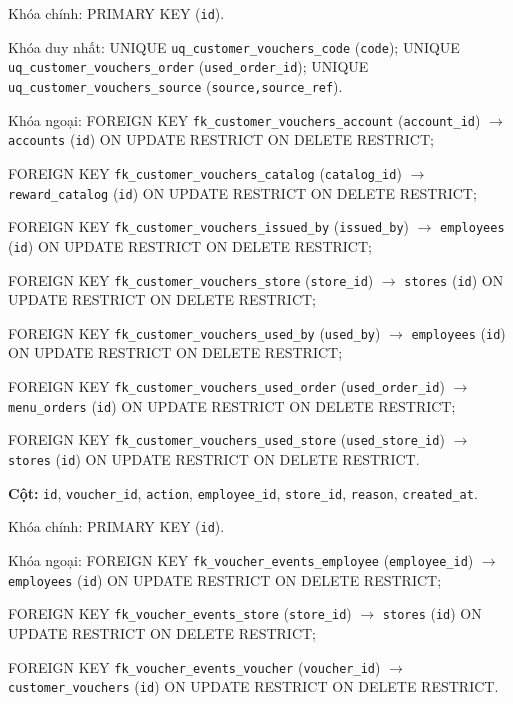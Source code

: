 \begin{description}[leftmargin=3.6cm,labelwidth=3.4cm,style=nextline]
Khóa chính: PRIMARY KEY (\texttt{id}).

Khóa duy nhất: UNIQUE \texttt{uq\_customer\_vouchers\_code} (\texttt{code}); UNIQUE \texttt{uq\_customer\_vouchers\_order} (\texttt{used\_order\_id}); UNIQUE \texttt{uq\_customer\_vouchers\_source} (\texttt{source,source\_ref}).

Khóa ngoại: FOREIGN KEY \texttt{fk\_customer\_vouchers\_account} (\texttt{account\_id}) $\rightarrow$ \texttt{accounts} (\texttt{id}) ON UPDATE RESTRICT ON DELETE RESTRICT;\par FOREIGN KEY \texttt{fk\_customer\_vouchers\_catalog} (\texttt{catalog\_id}) $\rightarrow$ \texttt{reward\_catalog} (\texttt{id}) ON UPDATE RESTRICT ON DELETE RESTRICT;\par FOREIGN KEY \texttt{fk\_customer\_vouchers\_issued\_by} (\texttt{issued\_by}) $\rightarrow$ \texttt{employees} (\texttt{id}) ON UPDATE RESTRICT ON DELETE RESTRICT;\par FOREIGN KEY \texttt{fk\_customer\_vouchers\_store} (\texttt{store\_id}) $\rightarrow$ \texttt{stores} (\texttt{id}) ON UPDATE RESTRICT ON DELETE RESTRICT;\par FOREIGN KEY \texttt{fk\_customer\_vouchers\_used\_by} (\texttt{used\_by}) $\rightarrow$ \texttt{employees} (\texttt{id}) ON UPDATE RESTRICT ON DELETE RESTRICT;\par FOREIGN KEY \texttt{fk\_customer\_vouchers\_used\_order} (\texttt{used\_order\_id}) $\rightarrow$ \texttt{menu\_orders} (\texttt{id}) ON UPDATE RESTRICT ON DELETE RESTRICT;\par FOREIGN KEY \texttt{fk\_customer\_vouchers\_used\_store} (\texttt{used\_store\_id}) $\rightarrow$ \texttt{stores} (\texttt{id}) ON UPDATE RESTRICT ON DELETE RESTRICT.

\item[\texttt{voucher\_events}] \textbf{Cột:} \texttt{id}, \texttt{voucher\_id}, \texttt{action}, \texttt{employee\_id}, \texttt{store\_id}, \texttt{reason}, \texttt{created\_at}.

Khóa chính: PRIMARY KEY (\texttt{id}).

Khóa ngoại: FOREIGN KEY \texttt{fk\_voucher\_events\_employee} (\texttt{employee\_id}) $\rightarrow$ \texttt{employees} (\texttt{id}) ON UPDATE RESTRICT ON DELETE RESTRICT;\par FOREIGN KEY \texttt{fk\_voucher\_events\_store} (\texttt{store\_id}) $\rightarrow$ \texttt{stores} (\texttt{id}) ON UPDATE RESTRICT ON DELETE RESTRICT;\par FOREIGN KEY \texttt{fk\_voucher\_events\_voucher} (\texttt{voucher\_id}) $\rightarrow$ \texttt{customer\_vouchers} (\texttt{id}) ON UPDATE RESTRICT ON DELETE RESTRICT.


\end{description}

